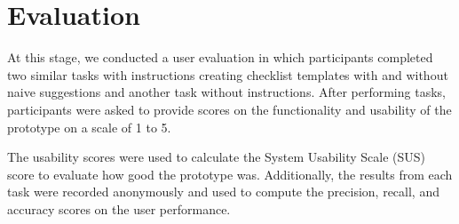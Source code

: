 \section{Evaluation}
At this stage, we conducted a user evaluation in which participants completed two similar tasks with instructions creating checklist templates with and without naive suggestions and another task without instructions. After performing tasks, participants were asked to provide scores on the functionality and usability of the prototype on a scale of 1 to 5.

The usability scores were used to calculate the System Usability Scale (SUS) score \cite{susscores} to evaluate how good the prototype was. Additionally, the results from each task were recorded anonymously and used to compute the precision, recall, and accuracy scores \cite{rocanalysis} on the user performance.
